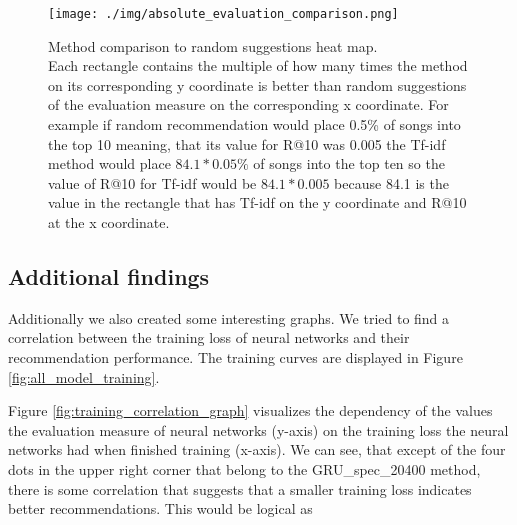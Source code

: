 \begin{figure}[h]
    \centering
	\texttt{[image: ./img/absolute\_evaluation\_comparison.png]}
	\caption[Method comparison to random suggestions heat map]{Method comparison to random suggestions heat map. \\
Each rectangle contains the multiple of how many times the method on its corresponding y coordinate is better than random suggestions of the evaluation measure on the corresponding x coordinate. For example if random recommendation would place 0.5\% of songs into the top 10 meaning, that its value for R@10 was 0.005 the Tf-idf method would place $84.1*0.05\%$ of songs into the top ten so the value of R@10 for Tf-idf would be $84.1*0.005$ because 84.1 is the value in the rectangle that has Tf-idf on the y coordinate and R@10 at the x coordinate.}
	\label{fig:absolute_evaluation_comparison}
\end{figure}

\subsection{Additional findings}\label{ssec:additional findings}
Additionally we also created some interesting graphs. We tried to find a correlation between the training loss of neural networks and their recommendation performance. The training curves are displayed in Figure \ref{fig:all_model_training}. 

Figure \ref{fig:training_correlation_graph} visualizes the dependency of the values the evaluation measure of neural networks (y-axis) on the training loss the neural networks had when finished training (x-axis). We can see, that except of the four dots in the upper right corner that belong to the GRU\_spec\_20400 method, there is some correlation that suggests that a smaller training loss indicates better recommendations. This would be logical as 

